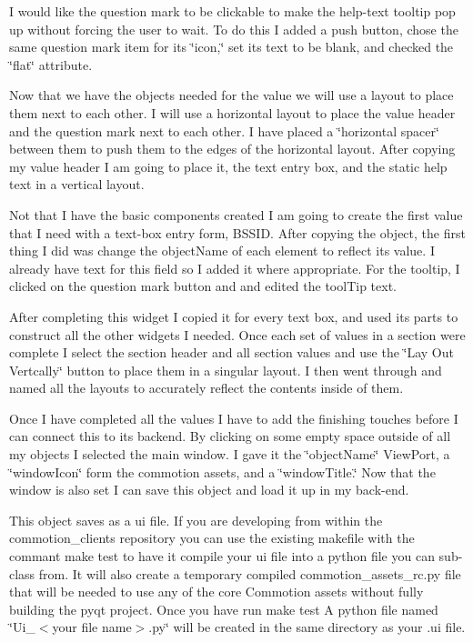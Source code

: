 I would like the question mark to be clickable to make the help-\/text tooltip pop up without forcing the user to wait. To do this I added a push button, chose the same question mark item for its \char`\"{}icon,\char`\"{} set its text to be blank, and checked the \char`\"{}flat\char`\"{} attribute.

Now that we have the objects needed for the value we will use a layout to place them next to each other. I will use a horizontal layout to place the value header and the question mark next to each other. I have placed a \char`\"{}horizontal spacer\char`\"{} between them to push them to the edges of the horizontal layout. After copying my value header I am going to place it, the text entry box, and the static help text in a vertical layout.

Not that I have the basic components created I am going to create the first value that I need with a text-\/box entry form, B\+S\+S\+I\+D. After copying the object, the first thing I did was change the object\+Name of each element to reflect its value. I already have text for this field so I added it where appropriate. For the tooltip, I clicked on the question mark button and and edited the tool\+Tip text.

After completing this widget I copied it for every text box, and used its parts to construct all the other widgets I needed. Once each set of values in a section were complete I select the section header and all section values and use the \char`\"{}\+Lay Out Vertcally\char`\"{} button to place them in a singular layout. I then went through and named all the layouts to accurately reflect the contents inside of them.

Once I have completed all the values I have to add the finishing touches before I can connect this to its backend. By clicking on some empty space outside of all my objects I selected the main window. I gave it the \char`\"{}object\+Name\char`\"{} View\+Port, a \char`\"{}window\+Icon\char`\"{} form the commotion assets, and a \char`\"{}window\+Title.\char`\"{} Now that the window is also set I can save this object and load it up in my back-\/end.

This object saves as a ui file. If you are developing from within the commotion\+\_\+clients repository you can use the existing makefile with the commant {\ttfamily make test} to have it compile your ui file into a python file you can sub-\/class from. It will also create a temporary compiled commotion\+\_\+assets\+\_\+rc.\+py file that will be needed to use any of the core Commotion assets without fully building the pyqt project. Once you have run {\ttfamily make test} A python file named \char`\"{}\+Ui\+\_\+$<$your file name$>$.\+py\char`\"{} will be created in the same directory as your .ui file.

